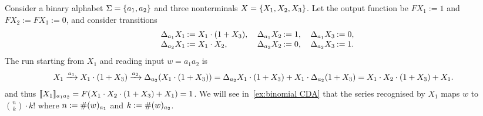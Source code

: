 \begin{example}
    \label{ex:binomial shuffle automaton}
    Consider a binary alphabet $\Sigma = \set{a_1, a_2}$
    and three nonterminals $X = \set{X_1, X_2, X_3}$.
    Let the output function be $F X_1 := 1$ and $F X_2 := F X_3 := 0$,
    and consider transitions
    \begin{align*}
        \arraycolsep=1pt
        \begin{array}{rl}
            \Delta_{a_1} X_1 &:= X_1 \cdot (1 + X_3), \\
            \Delta_{a_2} X_1 &:= X_1 \cdot X_2, \\
        \end{array}
        \quad 
        \begin{array}{rl}
            \Delta_{a_1} X_2 &:= 1, \\
            \Delta_{a_2} X_2 &:= 0, \\
        \end{array}
        \quad 
        \begin{array}{rl}
            \Delta_{a_1} X_3 &:= 0, \\
            \Delta_{a_2} X_3 &:= 1.
        \end{array}
    \end{align*}
    The run starting from $X_1$ and reading input $w = a_1 a_2$ is
    \begin{align*}
        X_1
            &\goesto {a_1} X_1 \cdot (1 + X_3)
            \goesto {a_2} \Delta_{a_2} (X_1 \cdot (1 + X_3))
            = \Delta_{a_2} X_1 \cdot (1 + X_3) + X_1 \cdot \Delta_{a_2} (1 + X_3)
            = X_1 \cdot X_2 \cdot (1 + X_3) + X_1.
    \end{align*}
    and thus $\sem {X_1}_{a_1 a_2} = F (X_1 \cdot X_2 \cdot (1 + X_3) + X_1) = 1$.
    We will see in~\cref{ex:binomial CDA} that the series recognised by $X_1$
    maps $w$ to ${n \choose k} \cdot k!$ where $n := \multiplicity {a_1} w$ and $k := \multiplicity {a_2} w$.
\end{example}

